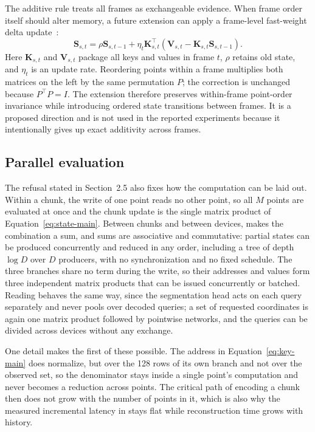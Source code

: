 \documentclass[11pt,a4paper]{article}
\newcommand{\Sstate}{\mathbf{S}}
\begin{document}
The additive rule treats all frames as exchangeable evidence. When frame order itself should alter memory, a future extension can apply a frame-level fast-weight delta update~\cite{schlag2021linear}:
\begin{equation}
\Sstate_{s,t}=\rho\Sstate_{s,t-1}+\eta_t\bm K_{s,t}^{\top}
(\bm V_{s,t}-\bm K_{s,t}\Sstate_{s,t-1}).
\label{eq:delta-main}
\end{equation}
Here $\bm K_{s,t}$ and $\bm V_{s,t}$ package all keys and values in frame $t$, $\rho$ retains old state, and $\eta_t$ is an update rate. Reordering points within a frame multiplies both matrices on the left by the same permutation $P$; the correction is unchanged because $P^\top P=I$. The extension therefore preserves within-frame point-order invariance while introducing ordered state transitions between frames. It is a proposed direction and is not used in the reported experiments because it intentionally gives up exact additivity across frames.

\subsection{Parallel evaluation}
\label{sec:parallel-eval}
The refusal stated in Section~2.5 also fixes how the computation can be laid out. Within a chunk, the write of one point reads no other point, so all $M$ points are evaluated at once and the chunk update is the single matrix product of Equation~\eqref{eq:state-main}. Between chunks and between devices,  makes the combination a sum, and sums are associative and commutative: partial states can be produced concurrently and reduced in any order, including a tree of depth $\log D$ over $D$ producers, with no synchronization and no fixed schedule. The three branches share no term during the write, so their addresses and values form three independent matrix products that can be issued concurrently or batched. Reading behaves the same way, since the segmentation head acts on each query separately and never pools over decoded queries; a set of requested coordinates is again one matrix product followed by pointwise networks, and the queries can be divided across devices without any exchange.

One detail makes the first of these possible. The address in Equation~\eqref{eq:key-main} does normalize, but over the 128 rows of its own branch and not over the observed set, so the denominator stays inside a single point's computation and never becomes a reduction across points. The critical path of encoding a chunk then does not grow with the number of points in it, which is also why the measured incremental latency in  stays flat while reconstruction time grows with history.
\end{document}
